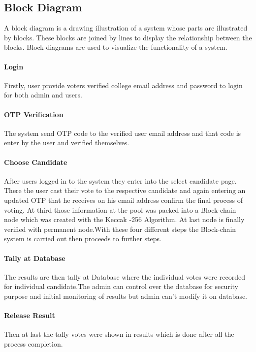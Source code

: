 \documentclass[a4paper,12pt]{report}
\begin{document}
\subsection{Block Diagram}
A block diagram is a drawing illustration of a system whose parts are illustrated by blocks. These blocks are joined by lines to display the relationship between the blocks. Block diagrams are used to visualize the functionality of a system.

\paragraph{Login}
Firstly, user provide voters verified college email address and password to login for both admin and users.

\paragraph{OTP Verification}
The system send OTP code to the verified user email address and that code is enter by the user and verified themselves.

\paragraph{Choose Candidate}
After users logged in to the system they enter into the select candidate page. There the user cast their vote to the respective candidate and again entering an updated OTP that he receives on his email address confirm the final process of voting. At third those information at the pool was packed into a Block-chain node which was created with the Keccak -256 Algorithm. At last node is finally verified with permanent node.With these four different steps the Block-chain system is carried out then proceeds to further steps.

\paragraph{Tally at Database}
The results are then tally at Database where the individual votes were recorded for individual candidate.The admin can control over the database for security purpose and initial monitoring of results but admin can't modify it on database.

\paragraph{Release Result}
Then at last the tally votes were shown in results which is done after all the process completion.
\end{document}
